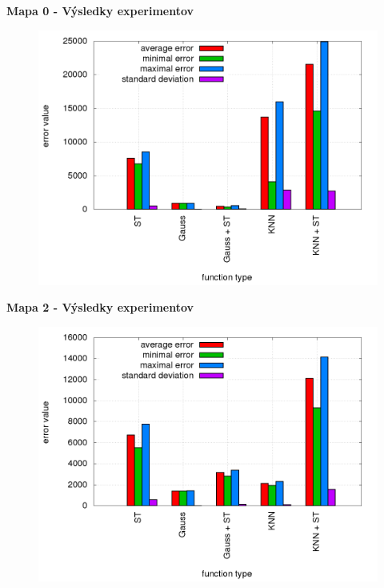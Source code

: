 \documentclass[xcolor=dvipsnames]{beamer}
\begin{document}
\begin{frame}{\bf Mapa 0 - Výsledky experimentov}

\begin{figure}[!htb]
\centering
\includegraphics[scale=.36]{../../results_q_learning/map_0/trials_average_results.png}
\end{figure}

\end{frame}

\begin{frame}{\bf Mapa 2 - Výsledky experimentov}

\begin{figure}[!htb]
\centering
\includegraphics[scale=.36]{../../results_q_learning/map_2/trials_average_results.png}
\end{figure}

\end{frame}
\end{document}
